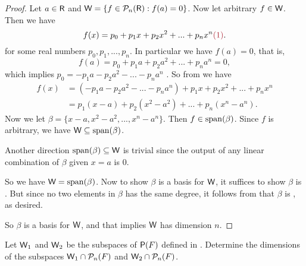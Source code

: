 \begin{proof}
Let \(a \in \textsf{R}\) and \(\textsf{W} = \{ f \in \mathcal{P}_n(\textsf{R}) : f(a) = 0 \}\).
Now let arbitrary \(f \in \textsf{W}\).
Then we have
\[
    f(x) = p_0 + p_1 x + p_2 x^2 + ... + p_n x^n \MAROON{(1)}.
\]
for some real numbers \(p_0, p_1, ..., p_n\).
In particular we have \(f(a) = 0\), that is,
\[
    f(a) = p_0 + p_1 a + p_2 a^2 + ... + p_n a^n = 0,
\]
which implies \(p_0 = -p_1 a - p_2 a^2 - ... - p_n a^n\) .
So from  we have
\begin{align*}
    f(x) & = (-p_1 a - p_2 a^2 - ... - p_n a^n) + p_1 x + p_2 x^2 + ... + p_n x^n \\
         & = p_1(x - a) + p_2(x^2 - a^2) + ... + p_n (x^n - a^n).
\end{align*}
Now we let \(\beta = \{ x - a, x^2 - a^2, ..., x^n - a^n \}\).
Then \(f \in \operatorname{span}(\beta)\).
Since \(f\) is arbitrary, we have \(\textsf{W} \subseteq \operatorname{span}(\beta)\).

Another direction \(\operatorname{span}(\beta) \subseteq \textsf{W}\) is trivial since the output of any linear combination of \(\beta\) given \(x = a\) is \(0\).

So we have \(\textsf{W} = \operatorname{span}(\beta)\).
Now to show \(\beta\) is a basis for \(\textsf{W}\), it suffices to show \(\beta\) is \LID{}.
But since no two elements in \(\beta\) has the same degree, it follows from  that \(\beta\) is \LID{}, as desired.

So \(\beta\) is a basis for \(\textsf{W}\), and that implies \(\textsf{W}\) has dimension \(n\).
\end{proof}

\begin{exercise} \label{exercise 1.6.27}
Let \(\textsf{W}_1\) and \(\textsf{W}_2\) be the subspaces of \(\textsf{P}(F)\) defined in .
Determine the dimensions of the subspaces \(\textsf{W}_1 \cap \mathcal{P}_n(F)\) and \(\textsf{W}_2 \cap \mathcal{P}_n(F)\).
\end{exercise}


